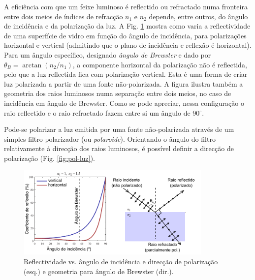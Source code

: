 \documentclass[12pt,a4paper,oneside]{paper}
\begin{document}
A eficiência com que um feixe luminoso é reflectido ou refractado numa fronteira entre dois meios de índices de refracção
$n_1$ e $n_2$ depende, entre outros, do ângulo de incidência e da polarização da luz. A Fig. \ref{fig:brewster} mostra como
varia a reflectividade de uma superfície de vidro em função do ângulo de incidência, para polarizações horizontal e vertical
(admitindo que o plano de incidência e reflexão é horizontal). Para um ângulo específico, designado \emph{ângulo de Brewster}
e dado por $\theta_B=\arctan(n_2/n_1)$, a componente horizontal da polarização não é reflectida, pelo que a luz reflectida fica
com polarização vertical. Esta é uma forma de criar luz polarizada a partir de uma fonte não-polarizada. A figura ilustra também
a geometria dos raios luminosos numa separação entre dois meios, no caso de incidência em ângulo de Brewster. Como se pode apreciar,
nessa configuração o raio reflectido e o raio refractado fazem entre si um ângulo de 90$^\circ$.

Pode-se polarizar a luz emitida por uma fonte não-polarizada através de um simples filtro polarizador (ou \textit{polaroide}).
Orientando o ângulo do filtro relativamente à direcção dos raios luminosos, é possível definir a direcção de polarização
(Fig. \ref{fig:pol-luz}).

\begin{figure}[H]
\begin{center}
	\includegraphics[width=0.85\textwidth]{./otica_images/2-brewster}
	\caption{Reflectividade vs. ângulo de incidência e direcção de polarização (esq.) e geometria para ângulo de Brewster
    (dir.). \label{fig:brewster}} 
\end{center}
\end{figure}
\end{document}
